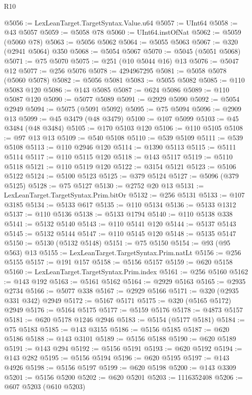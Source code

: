\begin{lexlean}{R10}
\begin{coremodule}
{{{{{{{{{{{{{{{{{{{{{{{{{{{{{{{{{{{{{{{{{{{{{{{{{{{{{{{{{{{{{{{{{{{{{{{{{{{{{{{{{{{{@5056 := LexLeanTarget.TargetSyntax.Value.u64
@5057 := UInt64
@5058 := @43 @5057
@5059 := @5058 @78
@5060 := UInt64.instOfNat
@5062 := @5059 (@5060 @78)
@5063 := @5056 @5062
@5064 := @5055 @5063
@5067 := @320 (@2941 @5064) @350
@5068 := @5054 @5067
@5070 := @5045 (@5051 @5068)
@5071 := @75 @5070
@5075 := @251 (@10 @5044 @16) @13
@5076 := @5047 @12
@5077 := @256 @5076
@5078 := 4294967295
@5081 := @5058 @5078 (@5060 @5078)
@5082 := @5056 @5081
@5083 := @5055 @5082
@5085 := @110 @5083 @120
@5086 := @143 @5085
@5087 := @624 @5086
@5089 := @110 @5087 @120
@5090 := @5077 @5089
@5091 := @2929 @5090
@5092 := @5054 @2949
@5094 := @5075 (@5091 @5092)
@5095 := @75 @5094
@5096 := @2909 @13
@5099 := @45 @3479 (@48 @3479)
@5100 := @107 @5099
@5103 := @45 @3484 (@48 @3484)
@5105 := @170 @5103 @120
@5106 := @110 @5105
@5108 := @97 @13 @13
@5109 := @540 @5108
@5110 := @539 @5109
@5111 := @539 @5108
@5113 := @110 @2946 @120
@5114 := @1390 @5113
@5115 := @5111 @5114
@5117 := @110 @5115 @120
@5118 := @143 @5117
@5119 := @5110 @5118
@5121 := @110 @5119 @120
@5122 := @3154 @5121
@5123 := @5106 @5122
@5124 := @5100 @5123
@5125 := @379 @5124
@5127 := @5096 (@379 @5125)
@5128 := @75 @5127
@5130 := @2752 @20 @13
@5131 := LexLeanTarget.TargetSyntax.Prim.bitOr
@5132 := @256 @5131
@5133 := @107 @3185
@5134 := @5133 @617
@5135 := @110 @5134
@5136 := @5133 @1312
@5137 := @110 @5136
@5138 := @5133 @1794
@5140 := @110 @5138 @338
@5141 := @5132 @5140
@5143 := @110 @5141 @120
@5144 := @5137 @5143
@5145 := @5132 @5144
@5147 := @110 @5145 @120
@5148 := @5135 @5147
@5150 := @5130 (@5132 @5148)
@5151 := @75 @5150
@5154 := @93 (@95 @563) @13
@5155 := LexLeanTarget.TargetSyntax.Prim.natLt
@5156 := @256 @5155
@5157 := @191 @157
@5158 := @5156 @5157
@5159 := @620 @5158
@5160 := LexLeanTarget.TargetSyntax.Prim.index
@5161 := @256 @5160
@5162 := @143 @192
@5163 := @5161 @5162
@5164 := @2929 @5163
@5165 := @2935 @2734
@5166 := @5077 @338
@5167 := @2929 @5166
@5171 := @320 (@2935 @331 @342) @2949
@5172 := @5167 @5171
@5175 := @320 (@5165 @5172) @2949
@5176 := @5164 @5175
@5177 := @5159 @5176
@5178 := @4873 @5157
@5181 := @620 @5178 @1246 @2946
@5183 := @5154 (@5177 @5181)
@5184 := @75 @5183
@5185 := @143 @3155
@5186 := @5156 @5185
@5187 := @620 @5186
@5188 := @143 @3101
@5189 := @5156 @5188
@5190 := @620 @5189
@5191 := @143 @294
@5192 := @5156 @5191
@5193 := @620 @5192
@5194 := @143 @282
@5195 := @5156 @5194
@5196 := @620 @5195
@5197 := @143 @4926
@5198 := @5156 @5197
@5199 := @620 @5198
@5200 := @143 @3309
@5201 := @5156 @5200
@5202 := @620 @5201
@5203 := 1116352408
@5206 := @607 @5203 (@610 @5203)
}}}}}}}}}}}}}}}}}}}}}}}}}}}}}}}}}}}}}}}}}}}}}}}}}}}}}}}}}}}}}}}}}}}}}}}}}}}}}}}}}}}}
\end{coremodule}
\end{lexlean}
